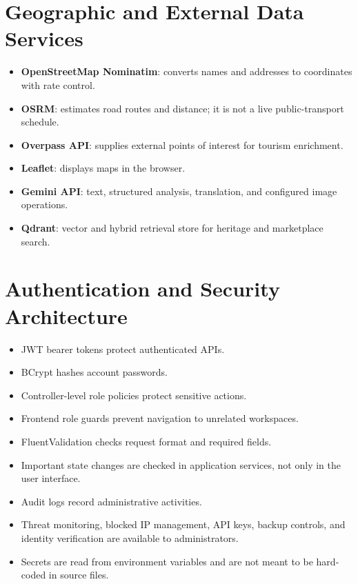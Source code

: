 \documentclass[12pt,a4paper]{report}
\begin{document}
\section{Geographic and External Data Services}

\begin{itemize}
  \item \textbf{OpenStreetMap Nominatim}: converts names and addresses to coordinates with rate control.
  \item \textbf{OSRM}: estimates road routes and distance; it is not a live public-transport schedule.
  \item \textbf{Overpass API}: supplies external points of interest for tourism enrichment.
  \item \textbf{Leaflet}: displays maps in the browser.
  \item \textbf{Gemini API}: text, structured analysis, translation, and configured image operations.
  \item \textbf{Qdrant}: vector and hybrid retrieval store for heritage and marketplace search.
\end{itemize}

\section{Authentication and Security Architecture}

\begin{itemize}
  \item JWT bearer tokens protect authenticated APIs.
  \item BCrypt hashes account passwords.
  \item Controller-level role policies protect sensitive actions.
  \item Frontend role guards prevent navigation to unrelated workspaces.
  \item FluentValidation checks request format and required fields.
  \item Important state changes are checked in application services, not only in the user interface.
  \item Audit logs record administrative activities.
  \item Threat monitoring, blocked IP management, API keys, backup controls, and identity verification are available to administrators.
  \item Secrets are read from environment variables and are not meant to be hard-coded in source files.
\end{itemize}
\end{document}
